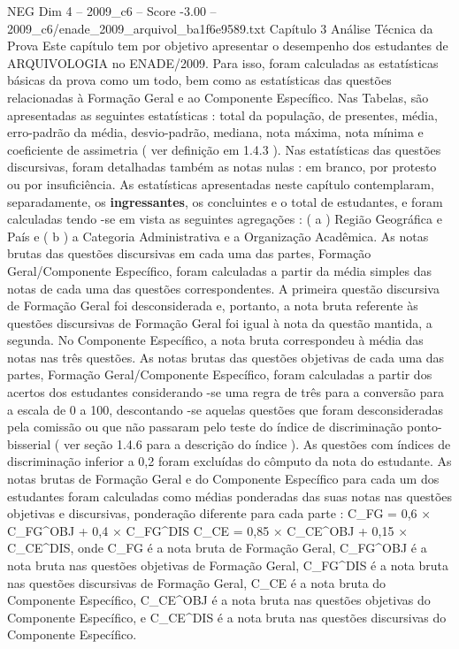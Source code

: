 \begin{textsample}{NEG Dim 4 – 2009\_c6 – Score -3.00 – 2009\_c6/enade\_2009\_arquivol\_ba1f6e9589.txt}  \label{ex:f4_neg_037}
Capítulo 3 Análise Técnica da Prova Este capítulo tem por objetivo apresentar o desempenho dos estudantes de ARQUIVOLOGIA no ENADE/2009.
Para isso, foram calculadas as estatísticas básicas da prova como um todo, bem como as estatísticas das questões relacionadas à Formação Geral e ao Componente Específico.
Nas Tabelas, são apresentadas as seguintes estatísticas : total da população, de presentes, média, erro-padrão da média, desvio-padrão, mediana, nota máxima, nota mínima e coeficiente de assimetria ( ver definição em 1.4.3 ).
Nas estatísticas das questões discursivas, foram detalhadas também as notas nulas : em branco, por protesto ou por insuficiência.
As estatísticas apresentadas neste capítulo contemplaram, separadamente, os \textbf{ingressantes}, os concluintes e o total de estudantes, e foram calculadas tendo -se em vista as seguintes agregações : ( a ) Região Geográfica e País e ( b ) a Categoria Administrativa e a Organização Acadêmica.
As notas brutas das questões discursivas em cada uma das partes, Formação Geral/Componente Específico, foram calculadas a partir da média simples das notas de cada uma das questões correspondentes.
A primeira questão discursiva de Formação Geral foi desconsiderada e, portanto, a nota bruta referente às questões discursivas de Formação Geral foi igual à nota da questão mantida, a segunda.
No Componente Específico, a nota bruta correspondeu à média das notas nas três questões.
As notas brutas das questões objetivas de cada uma das partes, Formação Geral/Componente Específico, foram calculadas a partir dos acertos dos estudantes considerando -se uma regra de três para a conversão para a escala de 0 a 100, descontando -se aquelas questões que foram desconsideradas pela comissão ou que não passaram pelo teste do índice de discriminação ponto-bisserial ( ver seção 1.4.6 para a descrição do índice ).
As questões com índices de discriminação inferior a 0,2 foram excluídas do cômputo da nota do estudante.
As notas brutas de Formação Geral e do Componente Específico para cada um dos estudantes foram calculadas como médias ponderadas das suas notas nas questões objetivas e discursivas, ponderação diferente para cada parte : C\_FG = 0,6 × C\_FG\textasciicircum{}OBJ + 0,4 × C\_FG\textasciicircum{}DIS C\_CE = 0,85 × C\_CE\textasciicircum{}OBJ + 0,15 × C\_CE\textasciicircum{}DIS, onde C\_FG é a nota bruta de Formação Geral, C\_FG\textasciicircum{}OBJ é a nota bruta nas questões objetivas de Formação Geral, C\_FG\textasciicircum{}DIS é a nota bruta nas questões discursivas de Formação Geral, C\_CE é a nota bruta do Componente Específico, C\_CE\textasciicircum{}OBJ é a nota bruta nas questões objetivas do Componente Específico, e C\_CE\textasciicircum{}DIS é a nota bruta nas questões discursivas do Componente Específico.

\end{textsample}
